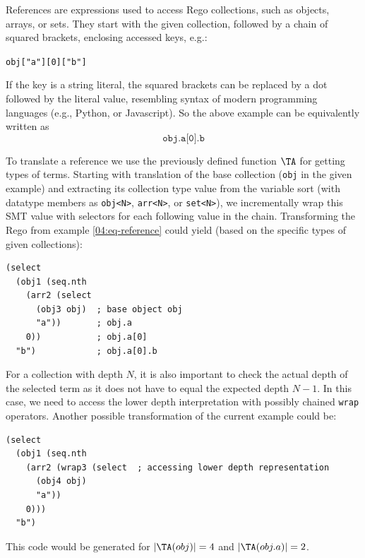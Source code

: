 References are expressions used to access Rego collections, such as objects, arrays, or sets.
They start with the given collection, followed by a chain of squared brackets, enclosing accessed keys, e.g.:
\begin{center}
  \texttt{obj["a"][0]["b"]}
\end{center}
If the key is a string literal, the squared brackets can be replaced by a dot followed by the literal value, resembling syntax of modern programming languages (e.g., Python, or Javascript).
So the above example can be equivalently written as
\begin{equation}
  \label{04:eq-reference}
  \texttt{obj.a[0].b}
\end{equation}

To translate a reference we use the previously defined function $\TA$ for getting types of terms.
Starting with translation of the base collection (\texttt{obj} in the given example) and extracting its collection type value from the variable sort (with datatype members as \texttt{obj<N>}, \texttt{arr<N>}, or \texttt{set<N>}), we incrementally wrap this SMT value with selectors for each following value in the chain.
Transforming the Rego from example \ref{04:eq-reference} could yield (based on the specific types of given collections):
\begin{lstlisting}[language=SMT]
(select 
  (obj1 (seq.nth
    (arr2 (select 
      (obj3 obj)  ; base object obj
      "a"))       ; obj.a
    0))           ; obj.a[0]
  "b")            ; obj.a[0].b
\end{lstlisting}

For a collection with depth $N$, it is also important to check the actual depth of the selected term as it does not have to equal the expected depth $N-1$.
In this case, we need to access the lower depth interpretation with possibly chained \texttt{wrap} operators.
Another possible transformation of the current example could be:
\begin{lstlisting}[language=SMT]
(select 
  (obj1 (seq.nth
    (arr2 (wrap3 (select  ; accessing lower depth representation
      (obj4 obj)
      "a"))
    0)))
  "b")
\end{lstlisting}
This code would be generated for $|\TA(obj)| = 4$ and $|\TA(obj.a)| = 2$.





